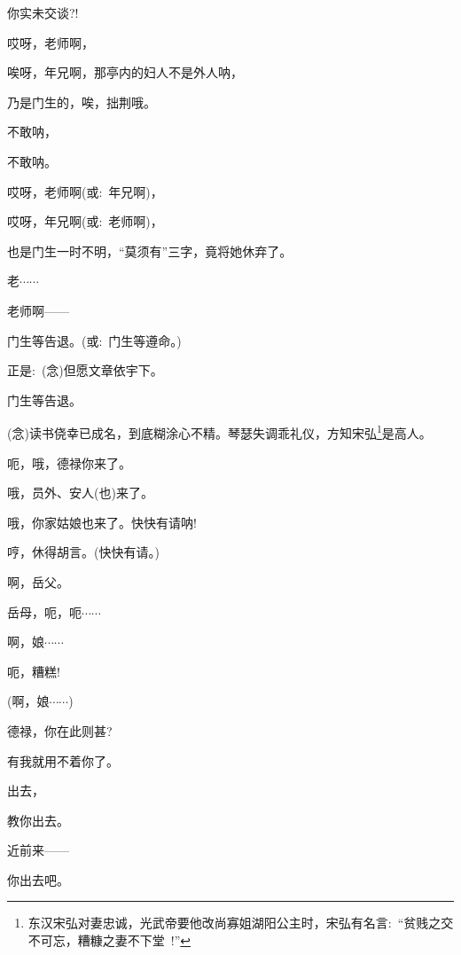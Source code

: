 {{你实未交谈?!}

{哎呀，老师啊，}

{唉呀，年兄啊，那亭内的妇人不是外人呐，}

{乃是门生的，唉，拙荆哦。}

{不敢呐，}

{不敢呐。}

{哎呀，老师啊({\akai 或}:~年兄啊)，}

{哎呀，年兄啊({\akai 或}:~老师啊)，}

{也是门生一时不明，``莫须有''三字，竟将她休弃了。}

{老$\cdots{}\cdots{}$}

{老师啊------}


{门生等告退。({\akai 或}:~门生等遵命。)}

{正是:~({\akai 念})但愿文章依宇下。}

{门生等告退。}

\vspace{5pt}


{({\akai 念})读书侥幸已成名，到底糊涂心不精。琴瑟失调乖礼仪，方知宋弘\footnote{东汉宋弘对妻忠诚，光武帝要他改尚寡姐湖阳公主时，宋弘有名言:~``贫贱之交不可忘，糟糠之妻不下堂~!''}是高人。}

{呃，哦，德禄你来了。}

{哦，员外、安人(也)来了。}

{哦，你家姑娘也来了。快快有请呐!}

{哼，休得胡言。(快快有请。)}

{啊，岳父。}

{岳母，呃，呃$\cdots{}\cdots{}$}

{啊，娘$\cdots{}\cdots{}$}

{呃，糟糕!}

{(啊，娘$\cdots{}\cdots{}$)}

{德禄，你在此则甚?}

{有我就用不着你了。}

{出去，}

{教你出去。}

{近前来------}

{你出去吧。}

}
